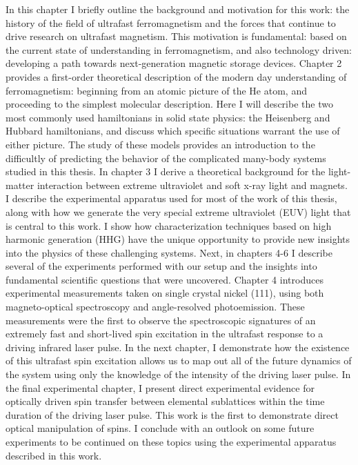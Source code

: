 In this chapter I briefly outline the background and motivation for this work: the history of the field of ultrafast ferromagnetism and the forces that continue to drive research on ultrafast magnetism. This motivation is fundamental: based on the current state of understanding in ferromagnetism, and also technology driven: developing a path towards next-generation magnetic storage devices. Chapter 2 provides a first-order theoretical description of the modern day understanding of ferromagnetism: beginning from an atomic picture of the He atom, and proceeding to the simplest molecular description. Here I will describe the two most commonly used hamiltonians in solid state physics: the Heisenberg and Hubbard hamiltonians, and discuss which specific situations warrant the use of either picture. The study of these models provides an introduction to the difficultly of predicting the behavior of the complicated many-body systems studied in this thesis. In chapter 3 I derive a theoretical background for the light-matter interaction between extreme ultraviolet and soft x-ray light and magnets. I describe the experimental apparatus used for most of the work of this thesis, along with how we generate the very special extreme ultraviolet (EUV) light that is central to this work. I show how characterization techniques based on high harmonic generation (HHG) have the unique opportunity to provide new insights into the physics of these challenging systems. Next, in chapters 4-6 I describe several of the experiments performed with our setup and the insights into fundamental scientific questions that were uncovered. Chapter 4 introduces experimental measurements taken on single crystal nickel (111), using both magneto-optical spectroscopy and angle-resolved photoemission. These measurements were the first to observe the spectroscopic signatures of an extremely fast and short-lived spin excitation in the ultrafast response to a driving infrared laser pulse. In the next chapter, I demonstrate how the existence of this ultrafast spin excitation allows us to map out all of the future dynamics of the system using only the knowledge of the intensity of the driving laser pulse. In the final experimental chapter, I present direct experimental evidence for optically driven spin transfer between elemental sublattices within the time duration of the driving laser pulse. This work is the first to demonstrate direct optical manipulation of spins. I conclude with an outlook on some future experiments to be continued on these topics using the experimental apparatus described in this work.

